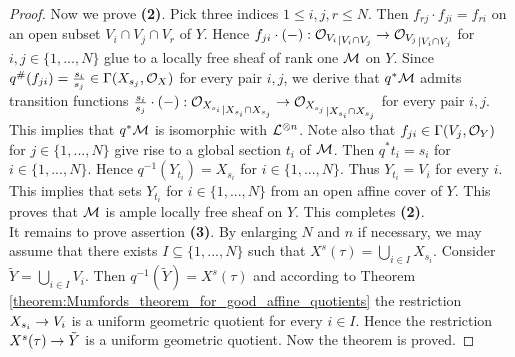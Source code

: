 \begin{proof}
Now we prove \textbf{(2)}. Pick three indices $1\leq i,j,r\leq N$. Then $f_{rj}\cdot f_{ji} = f_{ri}$ on an open subset $V_i\cap V_j\cap V_r$ of $Y$. Hence $f_{ji}\cdot (-):{{\mathcal O}_{V_i}}_{\mid V_i\cap V_j} \rightarrow {{\mathcal O}_{V_j}}_{\mid V_i\cap V_j}$ for $i,j \in \{1,...,N\}$ glue to a locally free sheaf of rank one ${\mathcal M}$ on $Y$. Since $q^{\#}(f_{ji}) = \frac{s_i}{s_j}\in \Gamma(X_{s_j},{\mathcal O}_X)$ for every pair $i,j$, we derive that $q^*{\mathcal M}$ admits transition functions $\frac{s_i}{s_j}\cdot (-):{{\mathcal O}_{X_{s_i}}}_{\mid X_{s_i}\cap X_{s_j}} \rightarrow {{\mathcal O}_{X_{s_j}}}_{\mid X_{s_i}\cap X_{s_j}}$ for every pair $i,j$. This implies that $q^*{\mathcal M}$ is isomorphic with ${\mathcal L}^{\otimes n}$. Note also that $f_{ji}\in \Gamma(V_j,{\mathcal O}_Y)$ for $j\in \{1,...,N\}$ give rise to a global section $t_i$ of ${\mathcal M}$. Then $q^*t_i = s_i$ for $i\in \{1,...,N\}$. Hence $q^{-1}\left(Y_{t_i}\right) = X_{s_i}$ for $i\in \{1,...,N\}$. Thus $Y_{t_i} = V_i$ for every $i$. This implies that sets $Y_{t_i}$ for $i\in \{1,...,N\}$ from an open affine cover of $Y$. This proves that ${\mathcal M}$ is ample locally free sheaf on $Y$. This completes \textbf{(2)}.\\
It remains to prove assertion \textbf{(3)}. By enlarging $N$ and $n$ if necessary, we may assume that there exists $I\subseteq \{1,...,N\}$ such that $X^s(\tau) = \bigcup_{i\in I}X_{s_i}$. Consider $\tilde{Y} = \bigcup_{i\in I}V_i$. Then $q^{-1}(\tilde{Y}) = X^s(\tau)$ and according to Theorem \ref{theorem:Mumfords_theorem_for_good_affine_quotients} the restriction $X_{s_i}\rightarrow V_i$ is a uniform geometric quotient for every $i\in I$. Hence the restriction $X^s(\tau)\rightarrow \tilde{Y}$ is a uniform geometric quotient. Now the theorem is proved.
\end{proof}









\small



    

